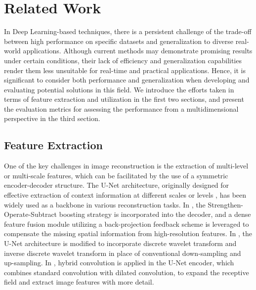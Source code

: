 \documentclass[lettersize,journal]{IEEEtran}
\begin{document}
\section{Related Work}
In Deep Learning-based techniques, there is a persistent challenge of the trade-off between high performance on specific datasets and generalization to diverse real-world applications. Although current methods may demonstrate promising results under certain conditions, their lack of efficiency and generalization capabilities render them less unsuitable for real-time and practical applications. Hence, it is significant to consider both performance and generalization when developing and evaluating potential solutions in this field. We introduce the efforts taken in terms of feature extraction and utilization in the first two sections, and present the evaluation metrics for assessing the performance from a multidimensional perspective in the third section.

\subsection{Feature Extraction}
One of the key challenges in image reconstruction is the extraction of multi-level or multi-scale features, which can be facilitated by the use of a symmetric encoder-decoder structure. The U-Net architecture, originally designed for effective extraction of context information at different scales or levels \cite{ronneberger2015u}, has been widely used as a backbone in various reconstruction tasks. In \cite{dong2020multi}, the Strengthen-Operate-Subtract boosting strategy is incorporated into the decoder, and a dense feature fusion module utilizing a back-projection feedback scheme is leveraged to compensate the missing spatial information from high-resolution features. In \cite{yang2019wavelet}, the U-Net architecture is modified to incorporate discrete wavelet transform and inverse discrete wavelet transform in place of conventional down-sampling and up-sampling. In \cite{feng2021urnet}, hybrid convolution is applied in the U-Net encoder, which combines standard convolution with dilated convolution, to expand the receptive field and extract image features with more detail.
\end{document}
